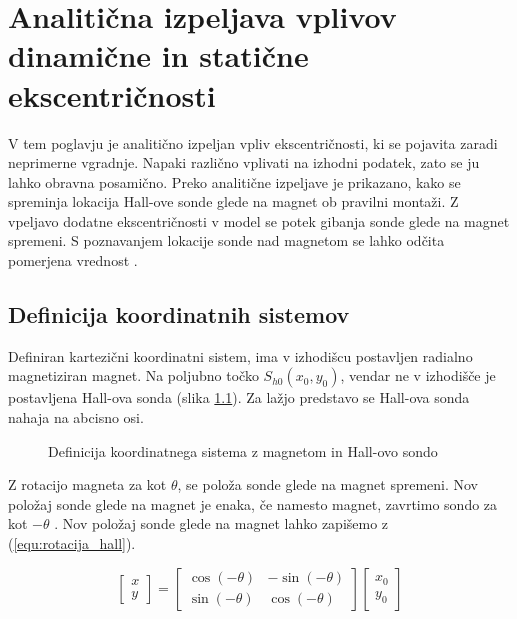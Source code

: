 \chapter{Analitična izpeljava vplivov dinamične in statične ekscentričnosti}

V tem poglavju je analitično izpeljan vpliv ekscentričnosti, ki se pojavita zaradi neprimerne vgradnje. Napaki različno vplivati na izhodni podatek, zato se ju lahko obravna posamično. Preko analitične izpeljave je prikazano, kako se spreminja lokacija Hall-ove sonde glede na magnet ob pravilni montaži. Z vpeljavo dodatne ekscentričnosti v model se potek gibanja sonde glede na magnet spremeni. S poznavanjem lokacije sonde nad magnetom se lahko odčita pomerjena vrednost \Bz.


\section{Definicija koordinatnih sistemov}

Definiran kartezični koordinatni sistem, ima v izhodišcu postavljen radialno magnetiziran magnet. Na poljubno točko $S_{h0}(x_0,y_0)$, vendar ne v izhodišče je postavljena Hall-ova sonda (slika \ref{fig:def_kks}). Za lažjo predstavo se Hall-ova sonda nahaja na abcisno osi.

\begin{figure}[h!]
	\centering
	\caption{Definicija koordinatnega sistema z magnetom in Hall-ovo sondo}
	\label{fig:def_kks}
\end{figure}

Z rotacijo magneta za kot $\theta$, se položa sonde glede na magnet spremeni. Nov položaj sonde glede na magnet je enaka, če namesto magnet, zavrtimo sondo za kot $-\theta$ . Nov položaj sonde glede na magnet lahko zapišemo z (\ref{equ:rotacija_hall}).

\begin{equation}
\label{equ:rotacija_hall}
\begin{bmatrix} x\\y \end{bmatrix}=
\begin{bmatrix} \cos(-\theta)&-\sin(-\theta)\\\sin(-\theta)&\cos(-\theta) \end{bmatrix}
\begin{bmatrix} x_0\\y_0 \end{bmatrix}
\end{equation}

